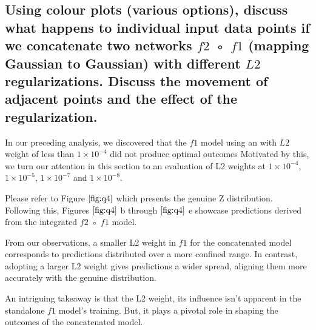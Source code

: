 \documentclass{article}
\begin{document}
\subsection{Using colour plots (various options), discuss what happens to individual
input data points if we concatenate two networks $f2$ ◦ $f1$ (mapping
Gaussian to Gaussian) with different $L2$ regularizations. Discuss the
movement of adjacent points and the effect of the regularization.}
\label{ssec:q4}

In our preceding analysis, we discovered that the $f1$
model using an with $L2$ weight of less than $1\times10^{-4}$ did not produce optimal outcomes
Motivated by this, we turn our attention in this section to an evaluation of L2 weights at
 $1\times10^{-4}$, $1\times10^{-5}$, $1\times10^{-7}$ and $1\times10^{-8}$.

Please refer to Figure $\ref{fig:q4}$ which presents the genuine Z distribution. 
Following this, Figures $\ref{fig:q4}$ b through $\ref{fig:q4}$ e 
showcase predictions derived from the integrated $f2$ ◦ $f1$ model.

From our observations, a smaller L2 weight in $f1$ 
for the concatenated model corresponds to predictions distributed over a more confined range.
In contrast, adopting a larger L2 weight gives predictions a wider spread, aligning them more accurately with the genuine distribution.

An intriguing takeaway is that the L2 weight, 
its influence isn't apparent in the standalone $f1$ model's training. 
But, it plays a pivotal role in shaping the outcomes of the concatenated model.
\end{document}
